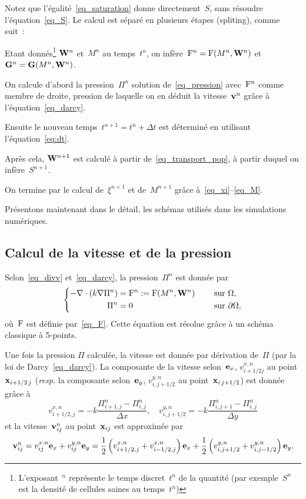 \documentclass[main.tex]{subfiles}
\begin{document}
Notez que l'égalité~\eqref{eq_saturation} donne directement~$S$, sans résoudre l'équation~\eqref{eq_S}. Le calcul est séparé en plusieurs étapes  (spliting), comme suit~:
\begin{myitemize}
\item Etant donnés\footnote{L'exposant~$^n$ représente le temps discret~$t^n$ de la quantité 
(par exemple~$S^n$ est la densité de cellules saines au temps~$t^n$)}
${\bf W}^n$ et~$M^n$ au temps~$t^n$, on infère~${\rm F}^n={\rm F}(M^n,{\bf W}^n)$ et
${\bf G}^n={\bf G}(M^n,{\bf W}^n)$.
\item On calcule d'abord la pression~$\Pi^n$ solution de~\eqref{eq_pression} avec~${\rm F}^n$ comme membre de droite, pression de laquelle on en déduit la vitesse~$\mathbf{v}^n$ grâce à l'équation~\eqref{eq_darcy}.
\item Ensuite le nouveau temps~$t^{n+1}=t^n+\Delta t$ est déterminé en utilisant l'équation~\eqref{eq:dt}.
\item Après cela, ${\bf W}^{n+1}$ est calculé à partir de~\eqref{eq_transport_pop}, à partir duquel on infère~$S^{n+1}$.
\item On termine par le calcul de~$\xi^{n+1}$ et de~$M^{n+1}$ grâce à~\eqref{eq_xi}--\eqref{eq_M}.
\end{myitemize}
Présentons maintenant dans le détail, les schémas utilisés dans les simulations numériques.

\subsection{Calcul de la vitesse et de la pression} 


Selon~\eqref{eq_divv} et~\eqref{eq_darcy}, 
la pression~$\Pi^n$ est donnée par
\begin{equation}\label{eq_pression_disc}
\left\{
\begin{aligned}
-\nabla\cdot (k\nabla \Pi^n)&={\rm F}^n:={\rm F}(M^n,{\bf W}^n) & \quad \textrm{ sur } & \Omega , \\
\Pi^n &=0 & \quad \textrm{ sur } & \partial \Omega ,
\end{aligned}
\right.
\end{equation}
où~${\rm F}$ est définie par~\eqref{eq_F}. 
Cette équation est résolue grâce à un schéma classique à 5-points. 


Une fois la pression $\Pi$ calculée, la vitesse est donnée par dérivation de~$\Pi$ (par la loi de Darcy~\eqref{eq_darcy}).
La composante de la vitesse selon~${\bf e}_x$, $v^{x,n}_{i+1/2 j}$ au point 
$\mathbf{x}_{i+1/2\,j}$ ({\it resp.} la composante selon~${\bf e}_y$, $v^{y,n}_{i,
  j+1/2}$ au point~${\mathbf{x}_{i\,j+1/2}}$) est donnée grâce à
\begin{equation*}
v^{x,n}_{i+1/2,j} = -k \frac{\Pi^n_{i+1,j}-\Pi^n_{i,j}}{\Delta x},\quad
v^{y,n}_{i,j+1/2} = -k \frac{\Pi^n_{i,j+1}-\Pi^n_{i,j}}{\Delta y}
\end{equation*}
et la vitesse~$\mathbf{v}^n_{ij}$ au point~$\mathbf{x}_{ij}$ est approximée par
\begin{align}
  \label{eq_vit_discr}
  \mathbf{v}^n_{ij}=    v^{x,n}_{ij}{\bf e}_x
  +v^{y,n}_{ij}{\bf e}_y=\frac{1}{2}\left(v^{x,n}_{i+1/2,j}
    +v^{x,n}_{i-1/2,j} \right) {\bf e}_x+\frac{1}{2}\left(v^{y,n}_{i,j+1/2}
    +v^{y,n}_{i,j-1/2} \right) {\bf e}_y.
\end{align}
\end{document}
